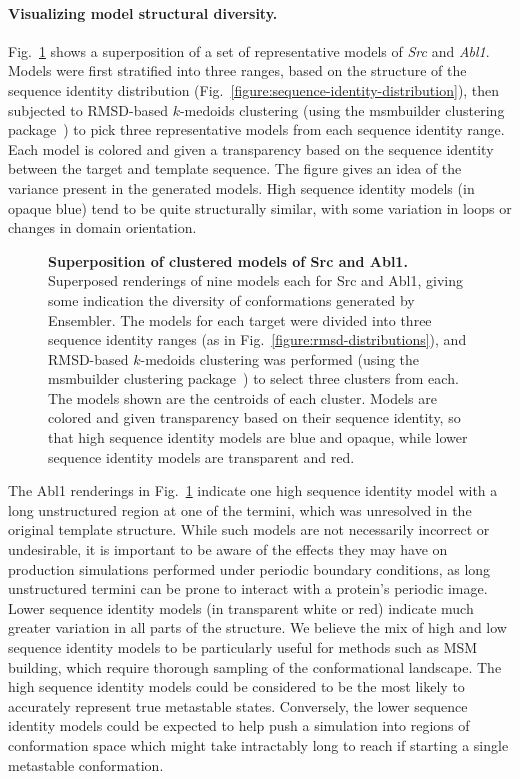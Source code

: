 \documentclass[10pt,letterpaper]{article}
\begin{document}
\paragraph{Visualizing model structural diversity.}
Fig.~\ref{figure:superposition} shows a superposition of a set of representative models of \emph{Src} and \emph{Abl1}.
Models were first stratified into three ranges, based on the structure of the sequence identity distribution (Fig.~\ref{figure:sequence-identity-distribution}), then subjected to RMSD-based $k$-medoids clustering (using the msmbuilder clustering package~\cite{msmbuilder}) to pick three representative models from each sequence identity range.
Each model is colored and given a transparency based on the sequence identity between the target and template sequence.
The figure gives an idea of the variance present in the generated models.
High sequence identity models (in opaque blue) tend to be quite structurally similar, with some variation in loops or changes in domain orientation.

\begin{figure}[h]
    
    \caption{{\bf Superposition of clustered models of Src and Abl1.}
    Superposed renderings of nine models each for Src and Abl1, 
    giving some indication the diversity of conformations generated by Ensembler.
    The models for each target were divided into three sequence identity ranges (as in Fig.~\ref{figure:rmsd-distributions}), and RMSD-based $k$-medoids clustering was performed (using the msmbuilder clustering package~\cite{msmbuilder}) to select three clusters from each.
    The models shown are the centroids of each cluster.
    Models are colored and given transparency based on their sequence identity, so that high sequence identity models are blue and opaque, while lower sequence identity models are transparent and red.
  }
  \label{figure:superposition}
\end{figure}

The Abl1 renderings in Fig.~\ref{figure:superposition} indicate one high sequence identity model with a long unstructured region at one of the termini, which was unresolved in the original template structure.
While such models are not necessarily incorrect or undesirable, it is important to be aware of the effects they may have on production simulations performed under periodic boundary conditions, as long unstructured termini can be prone to interact with a protein's periodic image.
Lower sequence identity models (in transparent white or red) indicate much greater variation in all parts of the structure.
We believe the mix of high and low sequence identity models to be particularly useful for methods such as MSM building, which require thorough sampling of the conformational landscape.
The high sequence identity models could be considered to be the most likely to accurately represent true metastable states.
Conversely, the lower sequence identity models could be expected to help push a simulation into regions of conformation space which might take intractably long to reach if starting a single metastable conformation.
\end{document}
